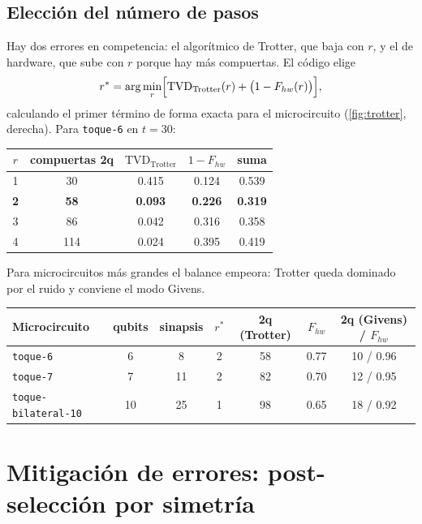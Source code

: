 \documentclass[11pt,a4paper]{article}
\newcommand{\TVD}{\mathrm{TVD}}
\newcommand{\code}[1]{\texttt{#1}}
\theoremstyle{plain}
\theoremstyle{definition}
\theoremstyle{remark}
\begin{document}
\subsection{Elección del número de pasos}

Hay dos errores en competencia: el algorítmico de Trotter, que baja con $r$, y el de hardware, que sube con $r$ porque hay más compuertas. El código elige
\begin{equation}
r^*=\arg\min_r\Bigl[\TVD_{\text{Trotter}}(r)+\bigl(1-F_{hw}(r)\bigr)\Bigr],
\end{equation}
calculando el primer término de forma exacta para el microcircuito (\cref{fig:trotter}, derecha). Para \code{toque-6} en $t=30$:

\begin{center}
\begin{tabular}{@{}ccccc@{}}
\toprule
$r$ & compuertas 2q & $\TVD_{\text{Trotter}}$ & $1-F_{hw}$ & suma\\
\midrule
1 & 30 & 0.415 & 0.124 & 0.539\\
\textbf{2} & \textbf{58} & \textbf{0.093} & \textbf{0.226} & \textbf{0.319}\\
3 & 86 & 0.042 & 0.316 & 0.358\\
4 & 114 & 0.024 & 0.395 & 0.419\\
\bottomrule
\end{tabular}
\end{center}

Para microcircuitos más grandes el balance empeora: Trotter queda dominado por el ruido y conviene el modo Givens.

\begin{center}
\begin{tabular}{@{}lcccccc@{}}
\toprule
Microcircuito & qubits & sinapsis & $r^*$ & 2q (Trotter) & $F_{hw}$ & 2q (Givens) / $F_{hw}$\\
\midrule
\code{toque-6} & 6 & 8 & 2 & 58 & 0.77 & 10 / 0.96\\
\code{toque-7} & 7 & 11 & 2 & 82 & 0.70 & 12 / 0.95\\
\code{toque-bilateral-10} & 10 & 25 & 1 & 98 & 0.65 & 18 / 0.92\\
\bottomrule
\end{tabular}
\end{center}

\section{Mitigación de errores: post-selección por simetría}
\label{sec:mitigacion}
\end{document}
